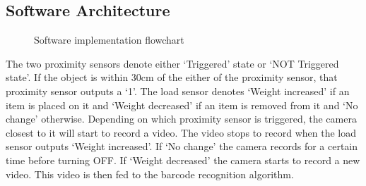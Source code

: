 \documentclass[times, 1pt, a4paper]{article}
\begin{document}
\subsection{Software Architecture} \label{subsection:software_architecture}

 \begin{figure}[h] 
	\centering
	\centering
	\caption{Software implementation flowchart}
	\label{fig:software_implementation}
	\end{figure}


The two proximity sensors denote either ‘Triggered’ state or ‘NOT Triggered state’. If the object is within 30cm of the either of the proximity sensor, that proximity sensor outputs a ‘1’. The load sensor denotes ‘Weight increased’ if an item is placed on it and ‘Weight decreased’ if an item is removed from it and ‘No change’ otherwise. Depending on which proximity sensor is triggered, the camera closest to it will start to record a video. The video stops to record when the load sensor outputs ‘Weight increased’. If ‘No change’ the camera records for a certain time before turning OFF. If ‘Weight decreased’ the camera starts to record a new video. This video is then fed to the barcode recognition algorithm.
\end{document}
